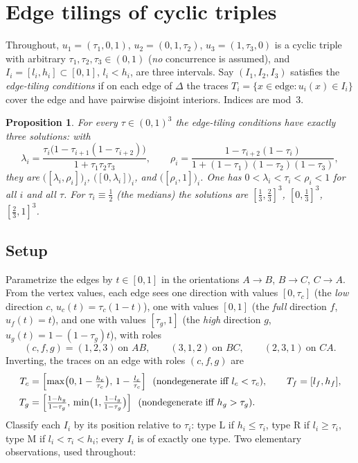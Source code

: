 \documentclass[11pt,reqno]{amsart}
\theoremstyle{plain}
\newtheorem{proposition}[theorem]{Proposition}
\theoremstyle{definition}
\theoremstyle{remark}
\begin{document}
\appendix
\section{Edge tilings of cyclic triples}\label{app:tilings}

Throughout, $u_1=(\tau_1,0,1)$, $u_2=(0,1,\tau_2)$, $u_3=(1,\tau_3,0)$ is a
cyclic triple with arbitrary $\tau_1,\tau_2,\tau_3\in(0,1)$ (\emph{no}
concurrence is assumed), and $I_i=[l_i,h_i]\subset[0,1]$, $l_i<h_i$, are three
intervals. Say $(I_1,I_2,I_3)$ satisfies the \emph{edge-tiling conditions} if on
each edge of $\Delta$ the traces $T_i=\{x\in\text{edge}: u_i(x)\in I_i\}$ cover
the edge and have pairwise disjoint interiors. Indices are mod~$3$.

\begin{proposition}\label{prop:tilings}
For every $\tau\in(0,1)^3$ the edge-tiling conditions have exactly three
solutions: with
\[
\lambda_i=\frac{\tau_i\bigl(1-\tau_{i+1}(1-\tau_{i+2})\bigr)}{1+\tau_1\tau_2\tau_3},
\qquad
\rho_i=\frac{1-\tau_{i+2}(1-\tau_i)}{1+(1-\tau_1)(1-\tau_2)(1-\tau_3)},
\]
they are $\bigl([\lambda_i,\rho_i]\bigr)_i$, $\bigl([0,\lambda_i]\bigr)_i$, and
$\bigl([\rho_i,1]\bigr)_i$. One has $0<\lambda_i<\tau_i<\rho_i<1$ for all $i$ and
all $\tau$. For $\tau_i\equiv\tfrac12$ (the medians) the solutions are
$[\tfrac13,\tfrac23]^3$, $[0,\tfrac13]^3$, $[\tfrac23,1]^3$.
\end{proposition}

\subsection*{Setup}
Parametrize the edges by $t\in[0,1]$ in the orientations $A\!\to\!B$,
$B\!\to\!C$, $C\!\to\!A$. From the vertex values, each edge sees one direction
with values $[0,\tau_c]$ (the \emph{low} direction $c$, $u_c(t)=\tau_c(1-t)$),
one with values $[0,1]$ (the \emph{full} direction $f$, $u_f(t)=t$), and one
with values $[\tau_g,1]$ (the \emph{high} direction $g$,
$u_g(t)=1-(1-\tau_g)t$), with roles
\[
(c,f,g)=(1,2,3)\ \text{on } AB,\qquad (3,1,2)\ \text{on } BC,\qquad
(2,3,1)\ \text{on } CA .
\]
Inverting, the traces on an edge with roles $(c,f,g)$ are
\begin{equation}\label{eq:traces}
\begin{aligned}
T_c&=\Bigl[\max\bigl(0,1-\tfrac{h_c}{\tau_c}\bigr),\,1-\tfrac{l_c}{\tau_c}\Bigr]
\ \ (\text{nondegenerate iff }l_c<\tau_c),\qquad T_f=[l_f,h_f],\\
T_g&=\Bigl[\tfrac{1-h_g}{1-\tau_g},\,
\min\bigl(1,\tfrac{1-l_g}{1-\tau_g}\bigr)\Bigr]
\ \ (\text{nondegenerate iff }h_g>\tau_g).
\end{aligned}
\end{equation}
Classify each $I_i$ by its position relative to $\tau_i$: type $\mathrm L$ if
$h_i\le\tau_i$, type $\mathrm R$ if $l_i\ge\tau_i$, type $\mathrm M$ if
$l_i<\tau_i<h_i$; every $I_i$ is of exactly one type. Two elementary
observations, used throughout:
\end{document}
